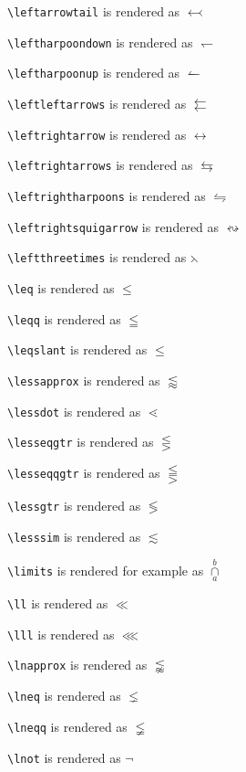 \texttt{\textbackslash leftarrowtail} is rendered as $\leftarrowtail$

\texttt{\textbackslash leftharpoondown} is rendered as $\leftharpoondown$

\texttt{\textbackslash leftharpoonup} is rendered as $\leftharpoonup$

\texttt{\textbackslash leftleftarrows} is rendered as $\leftleftarrows$

\texttt{\textbackslash leftrightarrow} is rendered as $\leftrightarrow$

\texttt{\textbackslash leftrightarrows} is rendered as $\leftrightarrows$

\texttt{\textbackslash leftrightharpoons} is rendered as $\leftrightharpoons$

\texttt{\textbackslash leftrightsquigarrow} is rendered as $\leftrightsquigarrow$

\texttt{\textbackslash leftthreetimes} is rendered as $\leftthreetimes$

\texttt{\textbackslash leq} is rendered as $\leq$

\texttt{\textbackslash leqq} is rendered as $\leqq$

\texttt{\textbackslash leqslant} is rendered as $\leqslant$

\texttt{\textbackslash lessapprox} is rendered as $\lessapprox$

\texttt{\textbackslash lessdot} is rendered as $\lessdot$

\texttt{\textbackslash lesseqgtr} is rendered as $\lesseqgtr$

\texttt{\textbackslash lesseqqgtr} is rendered as $\lesseqqgtr$

\texttt{\textbackslash lessgtr} is rendered as $\lessgtr$

\texttt{\textbackslash lesssim} is rendered as $\lesssim$

\texttt{\textbackslash limits} is rendered for example as $\mathop\cap\limits_a^b$

\texttt{\textbackslash ll} is rendered as $\ll$

\texttt{\textbackslash lll} is rendered as $\lll$

\texttt{\textbackslash lnapprox} is rendered as $\lnapprox$

\texttt{\textbackslash lneq} is rendered as $\lneq$

\texttt{\textbackslash lneqq} is rendered as $\lneqq$

\texttt{\textbackslash lnot} is rendered as $\lnot$

